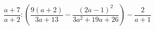 \begin{ex}[type=expression]
	\begin{condition}
		\( \dfrac{a+7}{a+2}:\left( \dfrac{9(a+2)}{3a+13}-\dfrac{(2a-1)^2}{3a^2+19a+26} \right) -\dfrac{2}{a+1}\)
	\end{condition}
\end{ex}
